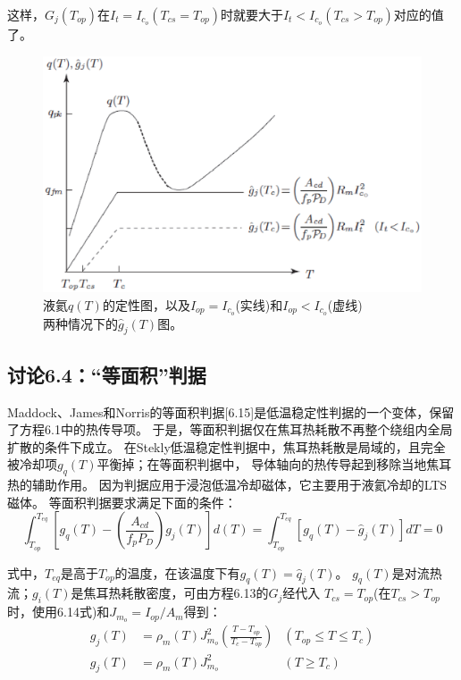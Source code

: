 这样，$G_j(T_{op})$在$I_t=I_{c_o}(T_{cs}=T_{op})$时就要大于$I_t<I_{c_o}(T_{cs}>T_{op})$对应的值了。
\begin{figure}[htbp]
	\centering
	\includegraphics[scale=0.7]{chpt6/figs/fig6.8.eps}
	\caption{液氦$q(T)$的定性图，以及$I_{op}=I_{c_o}$(实线)和$I_{op}<I_{c_o}$(虚线)$两种情况下的$$\hat{g}_j(T)$图。}
\end{figure}


\subsection{讨论6.4：“等面积”判据}
Maddock、James和Norris的等面积判据[6.15]是低温稳定性判据的一个变体，保留了方程6.1中的热传导项。
于是，等面积判据仅在焦耳热耗散不再整个绕组内全局扩散的条件下成立。
在Stekly低温稳定性判据中，焦耳热耗散是局域的，且完全被冷却项$g_q(T)$平衡掉；在等面积判据中，
导体轴向的热传导起到移除当地焦耳热的辅助作用。
因为判据应用于浸泡低温冷却磁体，它主要用于液氦冷却的LTS磁体。
等面积判据要求满足下面的条件：
\begin{equation}%
\int_{T_{op}}^{T_{eq}}[g_q(T)-(\frac{A_{cd}}{f_pP_D})g_j(T)]d(T)
=\int_{T_{op}}^{T_{eq}}[g_q(T)-\hat{g}_j(T)]dT=0
\end{equation}

式中，$T_{eq}$是高于$T_{op}$的温度，在该温度下有$g_q(T)=\hat{q}_j(T)$。
$g_q(T)$是对流热流；$g_i(T)$是焦耳热耗散密度，可由方程6.13的$G_j$经代入
$T_{cs}=T_{op}$(在$T_{cs}>T_{op}$时，使用6.14式)和$J_{m_o}=I_{op}/A_m$得到：
\begin{subequations}
	\begin{align}
	g_j(T)&=\rho_m(T)J_{m_o}^2(\frac{T-T_{op}}{T_c-T_{op}}) &(T_{op}\leq T \leq T_c)\\
	g_j(T)&=\rho_m(T)J_{m_o}^2 &(T \geq T_c)
	\end{align}
\end{subequations}


